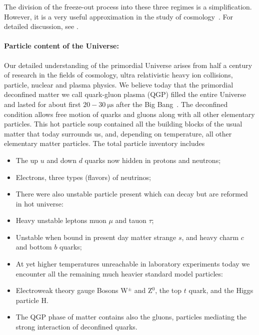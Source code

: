{The division of the freeze-out process into these three regimes is a simplification. However, it is a very useful approximation in the study of cosmology~\cite{Mangano:2005cc,Birrell:2014gea}. For detailed discussion, see \cite{Birrell:2012gg,Rafelski:2023emw}.

\paragraph{Particle content of the Universe:} 
Our detailed understanding of the primordial Universe arises from half a century of research in the fields of cosmology, ultra relativistic heavy ion collisions, particle, nuclear and plasma physics. We believe today that the primordial deconfined matter we call quark-gluon plasma (QGP) filled the entire Universe and lasted for about first $20-30\ \mathrm{\mu s}$ after the Big Bang~\cite{Letessier:2002ony}. The deconfined condition allows free motion of quarks and gluons along with all other elementary particles. This hot particle soup contained all the building blocks of the usual matter that today surrounds us, and, depending on temperature, all other elementary matter particles. The total particle inventory includes
\begin{itemize}
\item The up $u$ and down $d$ quarks now hidden in protons and neutrons;
\item Electrons, three types (flavors) of neutrinos;
\item[] There were also unstable particle present which can decay but are reformed in hot universe:
\item Heavy unstable leptons muon $\mu$ and tauon $\tau$;
\item Unstable when bound in present day matter strange $s$, and heavy charm $c$ and bottom $b$ quarks;
\item[] At yet higher temperatures unreachable in laboratory  experiments today we encounter all the remaining much heavier standard model particles: 
\item Electroweak theory gauge Bosons W$^\pm$ and Z$^0$, the top $t$ quark, and the Higgs particle H.
\item The QGP phase of matter contains also the gluons, particles mediating the strong interaction of deconfined quarks.
\end{itemize}

}
